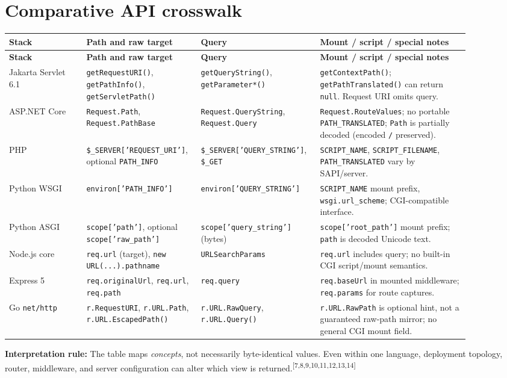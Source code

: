 \documentclass[10pt,letterpaper,oneside]{article}
\newcommand{\refs}[1]{\textsuperscript{\color{blue}[#1]}}
\newcommand{\code}[1]{\texttt{#1}}
\begin{document}
\section{Comparative API crosswalk}
\small
\begin{longtable}{P{0.16\linewidth}P{0.20\linewidth}P{0.22\linewidth}P{0.31\linewidth}}
\toprule
\textbf{Stack} & \textbf{Path and raw target} & \textbf{Query} & \textbf{Mount / script / special notes}\\\midrule\endfirsthead
\toprule\textbf{Stack} & \textbf{Path and raw target} & \textbf{Query} & \textbf{Mount / script / special notes}\\\midrule\endhead
Jakarta Servlet 6.1 & \code{getRequestURI()}, \code{getPathInfo()}, \code{getServletPath()} & \code{getQueryString()}, \code{getParameter*()} & \code{getContextPath()}; \code{getPathTranslated()} can return \code{null}. Request URI omits query.\\
ASP.NET Core & \code{Request.Path}, \code{Request.PathBase} & \code{Request.QueryString}, \code{Request.Query} & \code{Request.RouteValues}; no portable \code{PATH\_TRANSLATED}; \code{Path} is partially decoded (encoded \code{/} preserved).\\
PHP & \code{\$\_SERVER['REQUEST\_URI']}, optional \code{PATH\_INFO} & \code{\$\_SERVER['QUERY\_STRING']}, \code{\$\_GET} & \code{SCRIPT\_NAME}, \code{SCRIPT\_FILENAME}, \code{PATH\_TRANSLATED} vary by SAPI/server.\\
Python WSGI & \code{environ['PATH\_INFO']} & \code{environ['QUERY\_STRING']} & \code{SCRIPT\_NAME} mount prefix, \code{wsgi.url\_scheme}; CGI-compatible interface.\\
Python ASGI & \code{scope['path']}, optional \code{scope['raw\_path']} & \code{scope['query\_string']} (bytes) & \code{scope['root\_path']} mount prefix; \code{path} is decoded Unicode text.\\
Node.js core & \code{req.url} (target), \code{new URL(...).pathname} & \code{URLSearchParams} & \code{req.url} includes query; no built-in CGI script/mount semantics.\\
Express 5 & \code{req.originalUrl}, \code{req.url}, \code{req.path} & \code{req.query} & \code{req.baseUrl} in mounted middleware; \code{req.params} for route captures.\\
Go \code{net/http} & \code{r.RequestURI}, \code{r.URL.Path}, \code{r.URL.EscapedPath()} & \code{r.URL.RawQuery}, \code{r.URL.Query()} & \code{r.URL.RawPath} is optional hint, not a guaranteed raw-path mirror; no general CGI mount field.\\
\bottomrule
\end{longtable}
\normalsize
\textbf{Interpretation rule:} The table maps \emph{concepts}, not necessarily byte-identical values. Even within one language, deployment topology, router, middleware, and server configuration can alter which view is returned.\refs{7,8,9,10,11,12,13,14}
\end{document}
